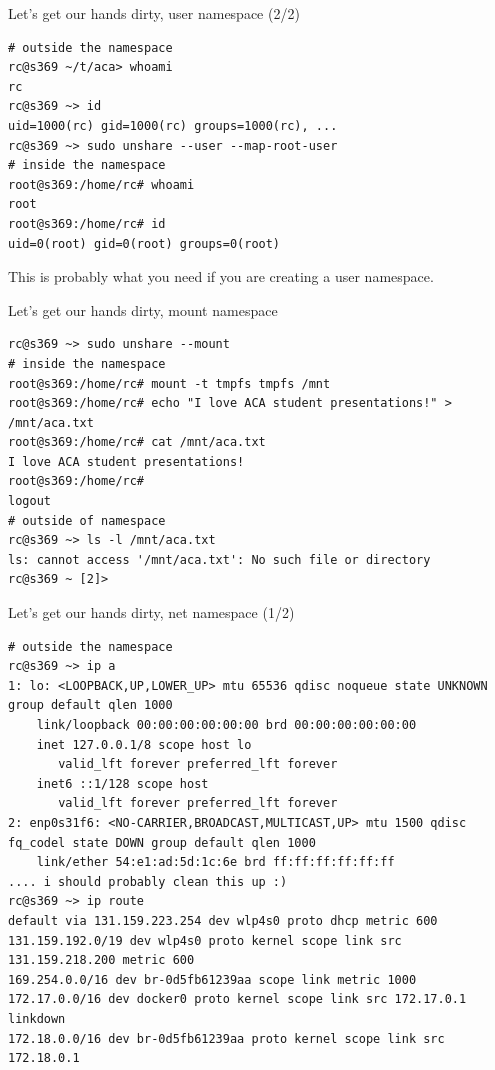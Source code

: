 \documentclass[
  english,          
  aspectratio=169,    %
]{tumbeamer}
\begin{document}
\begin{frame}[fragile]{Let's get our hands dirty, user namespace (2/2)}
\begin{verbatim}
# outside the namespace
rc@s369 ~/t/aca> whoami
rc
rc@s369 ~> id
uid=1000(rc) gid=1000(rc) groups=1000(rc), ...
rc@s369 ~> sudo unshare --user --map-root-user
# inside the namespace
root@s369:/home/rc# whoami
root
root@s369:/home/rc# id
uid=0(root) gid=0(root) groups=0(root)
\end{verbatim}
This is probably what you need if you are creating a user namespace.
\end{frame}

\begin{frame}[fragile]{Let's get our hands dirty, mount namespace}
\begin{verbatim}
rc@s369 ~> sudo unshare --mount
# inside the namespace
root@s369:/home/rc# mount -t tmpfs tmpfs /mnt
root@s369:/home/rc# echo "I love ACA student presentations!" > /mnt/aca.txt
root@s369:/home/rc# cat /mnt/aca.txt
I love ACA student presentations!
root@s369:/home/rc# 
logout
# outside of namespace
rc@s369 ~> ls -l /mnt/aca.txt
ls: cannot access '/mnt/aca.txt': No such file or directory
rc@s369 ~ [2]>
\end{verbatim}
\end{frame}

\begin{frame}[fragile]{Let's get our hands dirty, net namespace (1/2)}
\begin{verbatim}
# outside the namespace
rc@s369 ~> ip a
1: lo: <LOOPBACK,UP,LOWER_UP> mtu 65536 qdisc noqueue state UNKNOWN group default qlen 1000
    link/loopback 00:00:00:00:00:00 brd 00:00:00:00:00:00
    inet 127.0.0.1/8 scope host lo
       valid_lft forever preferred_lft forever
    inet6 ::1/128 scope host 
       valid_lft forever preferred_lft forever
2: enp0s31f6: <NO-CARRIER,BROADCAST,MULTICAST,UP> mtu 1500 qdisc fq_codel state DOWN group default qlen 1000
    link/ether 54:e1:ad:5d:1c:6e brd ff:ff:ff:ff:ff:ff
.... i should probably clean this up :)
rc@s369 ~> ip route
default via 131.159.223.254 dev wlp4s0 proto dhcp metric 600 
131.159.192.0/19 dev wlp4s0 proto kernel scope link src 131.159.218.200 metric 600 
169.254.0.0/16 dev br-0d5fb61239aa scope link metric 1000 
172.17.0.0/16 dev docker0 proto kernel scope link src 172.17.0.1 linkdown 
172.18.0.0/16 dev br-0d5fb61239aa proto kernel scope link src 172.18.0.1 
\end{verbatim}
\end{frame}
\end{document}
